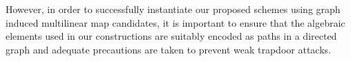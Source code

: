 \noindent However, in order to successfully instantiate our proposed schemes using graph induced multilinear map candidates, it is important to ensure that the algebraic elements used in our constructions are suitably encoded as paths in a directed graph and adequate precautions are taken to prevent weak trapdoor attacks.  

% 






 








